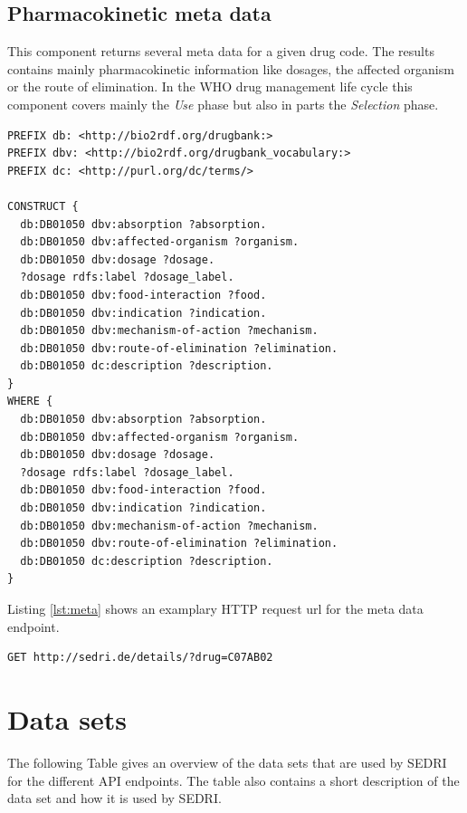 \subsection*{Pharmacokinetic meta data}
This component returns several meta data for a given drug code.
The results contains mainly pharmacokinetic information like dosages, the affected organism or the route of elimination.
In the WHO drug management life cycle this component covers mainly the \textit{Use} phase but also in parts the \textit{Selection} phase.

\begin{lstlisting}[caption=Example Diseasome query for possible drugs of Hypertension,label=lst:diseasome]
PREFIX db: <http://bio2rdf.org/drugbank:>
PREFIX dbv: <http://bio2rdf.org/drugbank_vocabulary:>
PREFIX dc: <http://purl.org/dc/terms/>

CONSTRUCT {
  db:DB01050 dbv:absorption ?absorption.
  db:DB01050 dbv:affected-organism ?organism.
  db:DB01050 dbv:dosage ?dosage.
  ?dosage rdfs:label ?dosage_label.
  db:DB01050 dbv:food-interaction ?food.
  db:DB01050 dbv:indication ?indication.
  db:DB01050 dbv:mechanism-of-action ?mechanism.
  db:DB01050 dbv:route-of-elimination ?elimination.
  db:DB01050 dc:description ?description.
}
WHERE {
  db:DB01050 dbv:absorption ?absorption.
  db:DB01050 dbv:affected-organism ?organism.
  db:DB01050 dbv:dosage ?dosage.
  ?dosage rdfs:label ?dosage_label.
  db:DB01050 dbv:food-interaction ?food.
  db:DB01050 dbv:indication ?indication.
  db:DB01050 dbv:mechanism-of-action ?mechanism.
  db:DB01050 dbv:route-of-elimination ?elimination.
  db:DB01050 dc:description ?description.
}
\end{lstlisting}
Listing \ref{lst:meta} shows an examplary HTTP request url for the meta data endpoint.
\begin{lstlisting}[label=lst:meta,caption=Example request for the meta data endpoint]
  GET http://sedri.de/details/?drug=C07AB02
\end{lstlisting}

\newpage
\section{Data sets}
\label{sec:data-sets}

The following Table gives an overview of the data sets that are used by SEDRI for the different API endpoints.
The table also contains a short description of the data set and how it is used by SEDRI.

